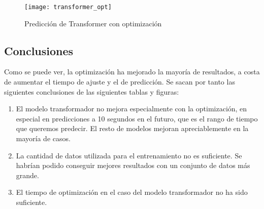 \begin{figure}[H]
    \centering
    \texttt{[image: transformer\_opt]}
    \caption{Predicción de Transformer con optimización}\label{fig:transformer_opt}
\end{figure}


\subsection{Conclusiones}



Como se puede ver, la optimización ha mejorado la mayoría de resultados, a costa de aumentar el tiempo de
ajuste y el de predicción. Se sacan por tanto las siguientes conclusiones de las siguientes tablas y figuras:
\begin{enumerate}
    \item El modelo transformador no mejora especialmente con la optimización, en especial en predicciones
        a 10 segundos en el futuro, que es el rango de tiempo que queremos predecir. El resto de modelos 
        mejoran apreciablemente en la mayoría de casos.
    \item La cantidad de datos utilizada para el entrenamiento no es suficiente. Se habrían podido conseguir mejores
        resultados con un conjunto de datos más grande.
    \item El tiempo de optimización en el caso del modelo transformador no ha sido suficiente.
\end{enumerate}

